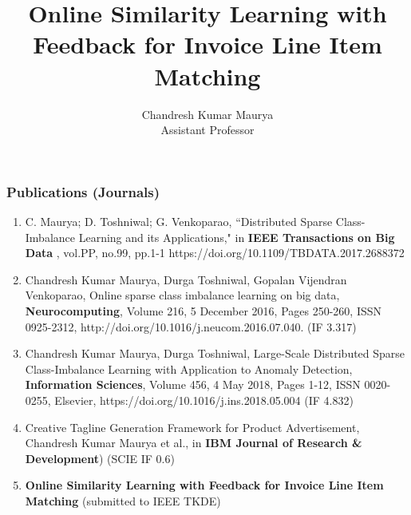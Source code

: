 \documentclass[blue]{beamer}
\title{Online Similarity Learning with Feedback for Invoice Line Item Matching}
\author[Chandresh]{Chandresh Kumar Maurya \\  Assistant Professor\\ }
\institute{E\"otv\"os Lor\'and University, Budapest, Hungary}
\begin{document}
\maketitle


%

\begin{frame}[shrink=20]
\footnotesize
\frametitle{Publications (Journals)}

\begin{enumerate} 
\item 

C. Maurya; D. Toshniwal; G. Venkoparao, ``Distributed Sparse Class-Imbalance Learning and its Applications," in {\bf IEEE Transactions on Big Data} , vol.PP, no.99, pp.1-1
https://doi.org/10.1109/TBDATA.2017.2688372

\item
Chandresh Kumar Maurya, Durga Toshniwal, Gopalan Vijendran Venkoparao, Online sparse class imbalance learning on big data, {\bf Neurocomputing}, Volume 216, 5 December 2016, Pages 250-260, ISSN 0925-2312, http://doi.org/10.1016/j.neucom.2016.07.040. (IF 3.317)

\item 
Chandresh Kumar Maurya, Durga Toshniwal, Large-Scale Distributed Sparse Class-Imbalance Learning with Application to Anomaly Detection,  {\bf Information Sciences}, Volume 456, 4 May 2018, Pages 1-12, ISSN 0020-0255, Elsevier, https://doi.org/10.1016/j.ins.2018.05.004 (IF 4.832)

\item   Creative Tagline Generation Framework for Product Advertisement, Chandresh Kumar Maurya et al.,  in {\bf IBM Journal of Research \& Development}) (SCIE IF 0.6)
\item {\bf Online Similarity Learning with Feedback for Invoice Line Item Matching} (submitted to IEEE TKDE)
\end{enumerate}
\end{frame}
\end{document}
